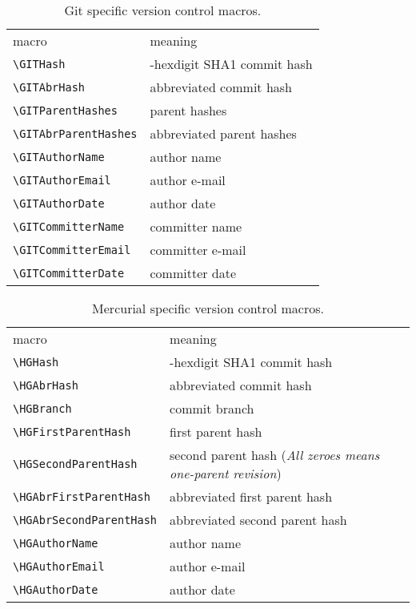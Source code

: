 \documentclass[11pt]{article}
\begin{document}
\begin{table}[p]
  \centering\small
  \begin{tabularx}{\textwidth}{p{12em}>{\raggedright\arraybackslash}X}
    macro & meaning\\\addlinespace \toprule\addlinespace
    \verb+\GITHash+ & 40-hexdigit SHA1 commit hash\\
    \verb+\GITAbrHash+ & abbreviated commit hash\\
    \verb+\GITParentHashes+ & parent hashes\\
    \verb+\GITAbrParentHashes+ & abbreviated parent hashes\\
    \verb+\GITAuthorName+ & author name\\
    \verb+\GITAuthorEmail+ & author e-mail\\
    \verb+\GITAuthorDate+ & author date\\
    \verb+\GITCommitterName+ & committer name\\
    \verb+\GITCommitterEmail+ & committer e-mail\\
    \verb+\GITCommitterDate+ & committer date\\
  \end{tabularx}
  \caption{Git specific version control macros.}
  \label{tab:vcGITmacros}
\end{table}

\begin{table}[p]
  \centering\small
  \begin{tabularx}{\textwidth}{p{12em}>{\raggedright\arraybackslash}X}
    macro & meaning\\\addlinespace \toprule\addlinespace
    \verb+\HGHash+ & 40-hexdigit SHA1 commit hash\\
    \verb+\HGAbrHash+ & abbreviated commit hash\\
    \verb+\HGBranch+ & commit branch\\
    \verb+\HGFirstParentHash+ & first parent hash\\
    \verb+\HGSecondParentHash+ & second parent hash (\textit{All zeroes means one-parent revision}) \\
    \verb+\HGAbrFirstParentHash+ & abbreviated first parent hash\\
    \verb+\HGAbrSecondParentHash+ & abbreviated second parent hash \\
    \verb+\HGAuthorName+ & author name\\
    \verb+\HGAuthorEmail+ & author e-mail\\
    \verb+\HGAuthorDate+ & author date\\
  \end{tabularx}
  \caption{Mercurial specific version control macros.}
  \label{tab:vcHGmacros}
\end{table}
\end{document}
